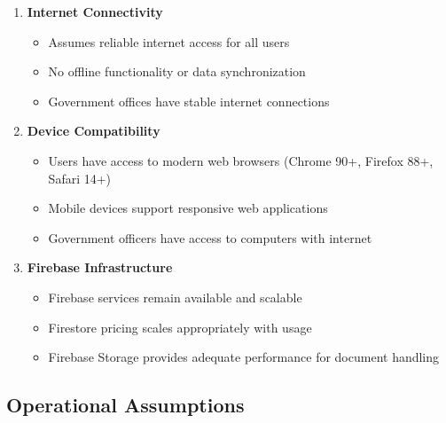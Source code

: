 \documentclass[11pt,a4paper]{article}
\begin{document}
\begin{enumerate}[leftmargin=*]
    \item \textbf{Internet Connectivity}
    \begin{itemize}
        \item Assumes reliable internet access for all users
        \item No offline functionality or data synchronization
        \item Government offices have stable internet connections
    \end{itemize}
    
    \item \textbf{Device Compatibility}
    \begin{itemize}
        \item Users have access to modern web browsers (Chrome 90+, Firefox 88+, Safari 14+)
        \item Mobile devices support responsive web applications
        \item Government officers have access to computers with internet
    \end{itemize}
    
    \item \textbf{Firebase Infrastructure}
    \begin{itemize}
        \item Firebase services remain available and scalable
        \item Firestore pricing scales appropriately with usage
        \item Firebase Storage provides adequate performance for document handling
    \end{itemize}
\end{enumerate}

\subsection{Operational Assumptions}
\end{document}
